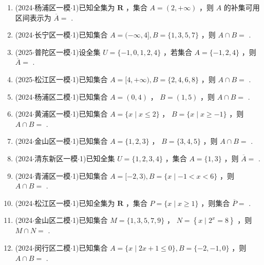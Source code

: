 \begin{enumerate}
    \item (2024$\cdot$杨浦区一模$\cdot$1)已知全集为 $\mathbf{R}$ ，集合 $A = \left( {2, + \infty }\right)$ ，则 $A$ 的补集可用区间表示为 $\overline{A} =$ \blkda[2]{$( - \infty ,2\rbrack$}.

    \item (2024$\cdot$长宁区一模$\cdot$1)已知集合 $A = ( - \infty ,4\rbrack ,B = \{ 1,3,5,7\}$ ，则 $A \cap  B =$ .

    \item (2025$\cdot$普陀区一模$\cdot$1)设全集 $U = \{  - 1,0,1,2,4\}$ ，若集合 $A = \{  - 1,2,4\}$ ，则 $\overline{A} =$ .

    \item (2025$\cdot$松江区一模$\cdot$1)已知集合 $A = \lbrack 4, + \infty ),B = \{ 2,4,6,8\}$ ，则 $A \cap  B =$ .

    \item (2024$\cdot$杨浦区二模$\cdot$1)已知集合 $A = \left( {0,4}\right)$ ， $B = \left( {1,5}\right)$ ，则 $A \cap  B =$ .

    \item (2024$\cdot$黄浦区一模$\cdot$1)已知集合 $A = \{ x \mid  x \leq  2\}$ ， $B = \{ x \mid  x \geq   - 1\}$ ，则 $A \cap  B =$ \blkda[2]{$[-1,2]$}.

    \item (2024$\cdot$金山区一模$\cdot$1)已知集合 $A = \{ 1,2,3\}$ ， $B = \{ 3,4,5\}$ ，则 $A \cap  B =$ .

    \item (2024$\cdot$清东新区一模$\cdot$1)已知全集 $U = \{ 1,2,3,4\}$ ，集合 $A = \{ 1,3\}$ ，则 $\overline{A} =$ .

    \item (2024$\cdot$青浦区一模$\cdot$1)已知集合 $A = \lbrack  - 2,3),B = \{ x \mid   - 1 < x < 6\}$ ，则 $A \cap  B =$ .

    \item (2024$\cdot$松江区一模$\cdot$1)已知全集为 $\mathbf{R}$ ，集合 $P = \{ x \mid  x \geq  1\}$ ，则集合 $\overline{P} =$ .

    \item (2024$\cdot$金山区二模$\cdot$1)已知集合 $M = \{ 1,3,5,7,9\}$ ， $N = \left\{  {x \mid  {2}^{x} = 8}\right\}$ ，则 $M \cap  N =$ .

    \item (2024$\cdot$闵行区二模$\cdot$1)已知集合 $A = \{ x \mid  {2x} + 1 \leq  0\} ,B = \{  - 2, - 1,0\}$ ，则 $A \cap  B =$ .


\end{enumerate}
